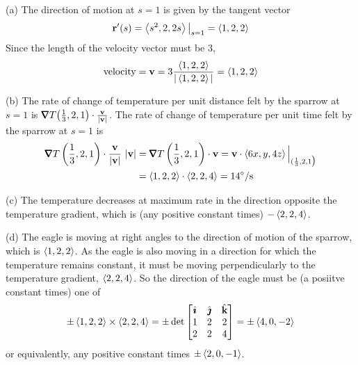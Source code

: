\begin{solution}
(a) The direction of motion at $s=1$ is given by the tangent vector
\begin{equation*}
\mathbf{r}'(s)=\left< s^2,2,2s\right>\big|_{s=1}=\left< 1,2,2\right>
\end{equation*}
Since the length of the velocity vector must be $3$,
\begin{equation*}
\text{velocity}=\mathbf{v}=3\frac{\left< 1,2,2\right>}{|\left< 1,2,2\right>|}=\left< 1,2,2\right>
\end{equation*}

(b) The rate of change of temperature per unit distance felt by the 
sparrow at $s=1$ is $\vnabla T\big(\frac{1}{3},2,1\big)\cdot\frac{\vv}{|\vv|}$.
 The rate of change of temperature per unit time felt by the 
sparrow at $s=1$ is
\begin{align*}
\vnabla T\left(\frac{1}{3},2,1\right)\cdot\frac{\vv}{|\vv|}\ |\vv|
&=\vnabla T\left(\frac{1}{3},2,1\right)\cdot\vv
=\vv\cdot\llt 6x,y,4z\rgt\Big|_{({1\over3},2,1\big)} \\
&=\llt 1,2,2\rgt\cdot\llt 2,2,4\rgt=14^\circ/{\rm s}
\end{align*}

(c) The temperature decreases at maximum rate in the direction
opposite the temperature gradient, which is (any positive constant times) $-\left< 2,2,4\right>$.

(d) The eagle is moving at right angles to the direction of motion
of the sparrow, which is $\left< 1,2,2\right>$. As the eagle is also moving 
in a direction for which the temperature remains constant, it must 
be moving perpendicularly to the temperature gradient, $\left< 2,2,4\right>$. 
So the direction of the eagle must be (a posiitve constant times) 
one of
\begin{align*}
   \pm\left< 1,2,2\right> \times\left< 2,2,4\right>
=\pm\det\left[\begin{matrix}
                     \hat{\pmb{\imath}} & \hat{\pmb{\jmath}} & \hat{\mathbf{k}} \\
                     1   &  2  & 2 \\
                     2   &  2  & 4
                \end{matrix}\right]
=\pm\left< 4,0,-2\right>
\end{align*}
or equivalently, any positive constant times $\pm\left< 2,0,-1\right>$.
\end{solution}

